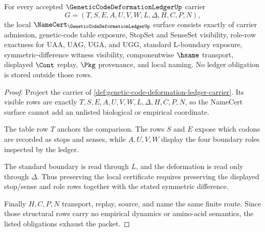 \begin{theorem}
\label{thm:genetic-code-deformation-ledger-namecert-obligations}
For every accepted $\GeneticCodeDeformationLedgerUp$ carrier
$$
G=(T,S,E,A,U,V,W,L,\Delta,H,C,P,N),
$$
the local $\NameCert_{\GeneticCodeDeformationLedgerUp}$ surface consists exactly of carrier admission, genetic-code table exposure, StopSet and SenseSet visibility, role-row exactness for $\mathrm{UAA}$, $\mathrm{UAG}$, $\mathrm{UGA}$, and $\mathrm{UGG}$, standard L-boundary exposure, symmetric-difference witness visibility, componentwise $\hsame$ transport, displayed $\Cont$ replay, $\Pkg$ provenance, and local naming. No ledger obligation is stored outside those rows.
\end{theorem}
\begin{proof}
Project the carrier of \autoref{def:genetic-code-deformation-ledger-carrier}. Its visible rows are exactly $T,S,E,A,U,V,W,L,\Delta,H,C,P,N$, so the NameCert surface cannot add an unlisted biological or empirical coordinate.

The table row $T$ anchors the comparison. The rows $S$ and $E$ expose which codons are recorded as stops and senses, while $A,U,V,W$ display the four boundary roles inspected by the ledger.

The standard boundary is read through $L$, and the deformation is read only through $\Delta$. Thus preserving the local certificate requires preserving the displayed stop/sense and role rows together with the stated symmetric difference.

Finally $H,C,P,N$ transport, replay, source, and name the same finite route. Since those structural rows carry no empirical dynamics or amino-acid semantics, the listed obligations exhaust the packet.
\end{proof}

